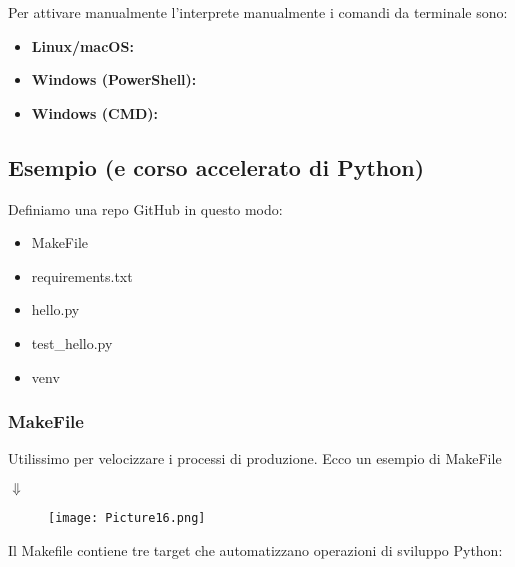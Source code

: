 \documentclass[a4paper,12pt]{article}
\begin{document}
Per attivare manualmente l'interprete manualmente i comandi da terminale sono:
\begin{itemize}
    \item \textbf{Linux/macOS: } 
    \item \textbf{Windows (PowerShell): } 
    \item \textbf{Windows (CMD): } 
\end{itemize}

\subsection{Esempio (e corso accelerato di Python)}
Definiamo una repo GitHub in questo modo:
\begin{itemize}
    \item MakeFile
    \item requirements.txt
    \item hello.py
    \item test\_hello.py
    \item venv
\end{itemize}

\subsubsection{MakeFile}
Utilissimo per velocizzare i processi di produzione. Ecco un esempio di MakeFile 
\begin{center}
    $\Downarrow$
\end{center}
\begin{figure}[H]
  \centering
  \texttt{[image: Picture16.png]}
  \label{etichetta16}
\end{figure}

Il Makefile contiene tre target che automatizzano operazioni di sviluppo Python:
\end{document}
